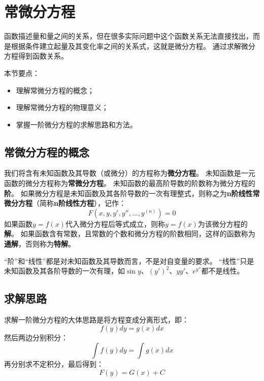 \section{常微分方程}

函数描述量和量之间的关系，但在很多实际问题中这个函数关系无法直接找出，而是根据条件建立起量及其变化率之间的关系式，这就是微分方程。
通过求解微分方程得到函数关系。

本节要点：
\begin{itemize}
    \item 理解常微分方程的概念；
    \item 理解常微分方程的物理意义；
    \item 掌握一阶微分方程的求解思路和方法。
\end{itemize}

\subsection{常微分方程的概念}

\begin{definition}[微分方程]
我们将含有未知函数及其导数（或微分）的方程称为{\bf 微分方程}。
未知函数是一元函数的微分方程称为{\bf 常微分方程}。
未知函数的最高阶导数的阶数称为微分方程的{\bf 阶}。
如果微分方程是未知函数及其各阶导数的一次有理整式，则称之为{\bf n阶线性常微分方程}（简称{\bf n阶线性方程}），记作：
\[
F\left( x,y,y',y'',...,y^{\left( n \right)} \right) =0
\]
如果函数$y=f\left( x \right) $代入微分方程后等式成立，则称$y=f\left( x \right) $为该微分方程的{\bf 解}。
如果函数含有常数，且常数的个数和微分方程的阶数相同，这样的函数称为{\bf 通解}，否则称为{\bf 特解}。
\end{definition}

“阶”和“线性”都是对未知函数及其导数而言，不是对自变量的要求。
“线性”只是未知函数及其各阶导数的一次有理，如$\sin y$、$\left( y' \right) ^2$、$yy'$、$e^{y''}$都不是线性。

\subsection{求解思路}

求解一阶微分方程的大体思路是将方程变成分离形式，即：
\[
f\left( y \right) dy=g\left( x \right) dx
\]
然后两边分别积分：
\[
\int{f\left( y \right) dy}=\int{g\left( x \right) dx}
\]
再分别求不定积分，最后得到：
\[
F\left( y \right) =G\left( x \right) +C
\]

